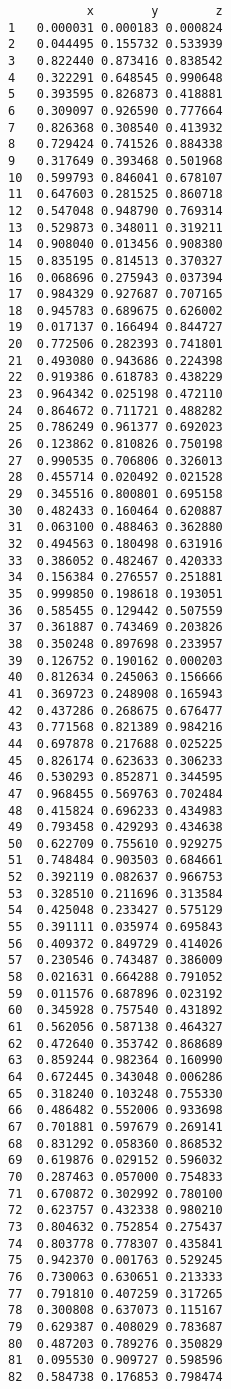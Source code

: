 \documentclass[
  10pt,
  a4paper,oneside]{article}
\begin{document}
\begin{verbatim}
           x        y        z
1   0.000031 0.000183 0.000824
2   0.044495 0.155732 0.533939
3   0.822440 0.873416 0.838542
4   0.322291 0.648545 0.990648
5   0.393595 0.826873 0.418881
6   0.309097 0.926590 0.777664
7   0.826368 0.308540 0.413932
8   0.729424 0.741526 0.884338
9   0.317649 0.393468 0.501968
10  0.599793 0.846041 0.678107
11  0.647603 0.281525 0.860718
12  0.547048 0.948790 0.769314
13  0.529873 0.348011 0.319211
14  0.908040 0.013456 0.908380
15  0.835195 0.814513 0.370327
16  0.068696 0.275943 0.037394
17  0.984329 0.927687 0.707165
18  0.945783 0.689675 0.626002
19  0.017137 0.166494 0.844727
20  0.772506 0.282393 0.741801
21  0.493080 0.943686 0.224398
22  0.919386 0.618783 0.438229
23  0.964342 0.025198 0.472110
24  0.864672 0.711721 0.488282
25  0.786249 0.961377 0.692023
26  0.123862 0.810826 0.750198
27  0.990535 0.706806 0.326013
28  0.455714 0.020492 0.021528
29  0.345516 0.800801 0.695158
30  0.482433 0.160464 0.620887
31  0.063100 0.488463 0.362880
32  0.494563 0.180498 0.631916
33  0.386052 0.482467 0.420333
34  0.156384 0.276557 0.251881
35  0.999850 0.198618 0.193051
36  0.585455 0.129442 0.507559
37  0.361887 0.743469 0.203826
38  0.350248 0.897698 0.233957
39  0.126752 0.190162 0.000203
40  0.812634 0.245063 0.156666
41  0.369723 0.248908 0.165943
42  0.437286 0.268675 0.676477
43  0.771568 0.821389 0.984216
44  0.697878 0.217688 0.025225
45  0.826174 0.623633 0.306233
46  0.530293 0.852871 0.344595
47  0.968455 0.569763 0.702484
48  0.415824 0.696233 0.434983
49  0.793458 0.429293 0.434638
50  0.622709 0.755610 0.929275
51  0.748484 0.903503 0.684661
52  0.392119 0.082637 0.966753
53  0.328510 0.211696 0.313584
54  0.425048 0.233427 0.575129
55  0.391111 0.035974 0.695843
56  0.409372 0.849729 0.414026
57  0.230546 0.743487 0.386009
58  0.021631 0.664288 0.791052
59  0.011576 0.687896 0.023192
60  0.345928 0.757540 0.431892
61  0.562056 0.587138 0.464327
62  0.472640 0.353742 0.868689
63  0.859244 0.982364 0.160990
64  0.672445 0.343048 0.006286
65  0.318240 0.103248 0.755330
66  0.486482 0.552006 0.933698
67  0.701881 0.597679 0.269141
68  0.831292 0.058360 0.868532
69  0.619876 0.029152 0.596032
70  0.287463 0.057000 0.754833
71  0.670872 0.302992 0.780100
72  0.623757 0.432338 0.980210
73  0.804632 0.752854 0.275437
74  0.803778 0.778307 0.435841
75  0.942370 0.001763 0.529245
76  0.730063 0.630651 0.213333
77  0.791810 0.407259 0.317265
78  0.300808 0.637073 0.115167
79  0.629387 0.408029 0.783687
80  0.487203 0.789276 0.350829
81  0.095530 0.909727 0.598596
82  0.584738 0.176853 0.798474

\end{verbatim}
\end{document}
